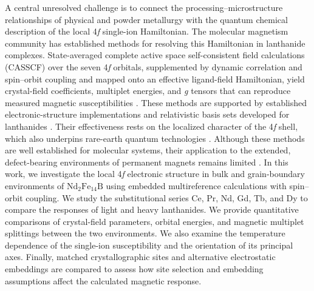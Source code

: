 \documentclass[final,1p,times]{elsarticle}
\DeclareRobustCommand{\rev}[1]{{\color{revcolor}#1}}
\newcommand{\ndfeb}{\mathrm{Nd_2Fe_{14}B}}
\begin{document}
A central unresolved challenge is to connect the processing–microstructure relationships of physical and powder metallurgy with the quantum chemical description of the local 4\textit{f} single-ion Hamiltonian. \rev{The molecular magnetism community has established methods for resolving this Hamiltonian in lanthanide complexes. State-averaged complete active space self-consistent field calculations (CASSCF) over the seven 4\textit{f} orbitals, supplemented by dynamic correlation and spin--orbit coupling and mapped onto an effective ligand-field Hamiltonian, yield crystal-field coefficients, multiplet energies, and \textit{g} tensors that can reproduce measured magnetic susceptibilities \cite{ungur2017,atanasov2012,atanasov2015,aravena2016,angeli2001}.} These methods are supported by established electronic-structure implementations and relativistic basis sets developed for lanthanides \cite{neese2022,pantazis2009,aravena2016basis}. Their effectiveness rests on the localized character of the 4\textit{f} shell, which also underpins rare-earth quantum technologies \cite{tittel2025}. Although these methods are well established for molecular systems, their application to the extended, defect-bearing environments of permanent magnets remains limited \cite{larson2003,delange2017}. \rev{In this work, we investigate the local 4\textit{f} electronic structure in bulk and grain-boundary environments of $\ndfeb$ using embedded multireference calculations with spin--orbit coupling. We study the substitutional series Ce, Pr, Nd, Gd, Tb, and Dy to compare the responses of light and heavy lanthanides. We provide quantitative comparisons of crystal-field parameters, orbital energies, and magnetic multiplet splittings between the two environments. We also examine the temperature dependence of the single-ion susceptibility and the orientation of its principal axes. Finally, matched crystallographic sites and alternative electrostatic embeddings are compared to assess how site selection and embedding assumptions affect the calculated magnetic response.}
\end{document}
